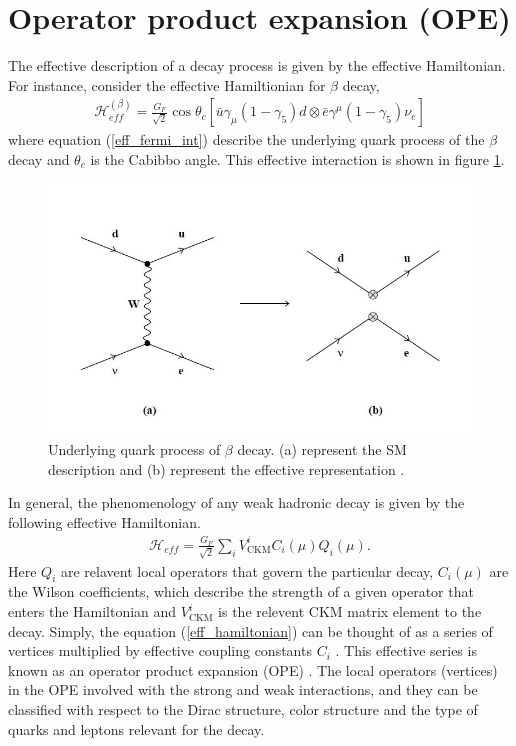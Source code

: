 \section{Operator product expansion (OPE)}
The effective description of a decay process is given by the effective Hamiltonian. For instance, consider the effective Hamiltionian for $\beta$ decay,
\begin{eqnarray}\label{eff_fermi_int}
\mathcal{H}_{e f f}^{(\beta)}=\frac{G_{F}}{\sqrt{2}} \cos \theta_{c}\left[\bar{u} \gamma_{\mu}\left(1-\gamma_{5}\right) d \otimes \bar{e} \gamma^{\mu}\left(1-\gamma_{5}\right) \nu_{e}\right]
\end{eqnarray}
where equation (\ref{eff_fermi_int}) describe the underlying quark process of the $\beta$ decay and $\theta_c$ is the Cabibbo angle. This effective interaction is shown in figure \ref{fig:fermi_int}.
\begin{figure}[H]
\centering
\includegraphics[width=12cm]{fermi_int.JPG}
\caption{\label{fig:fermi_int}
Underlying quark process of $\beta$ decay. (a) represent the SM description and (b) represent the effective representation \cite{Buras:1999rb} .}
\end{figure}
In general, the phenomenology of any weak hadronic decay is given by the following effective Hamiltonian.
\begin{eqnarray}\label{eff_hamiltonian}
\mathcal{H}_{e f f}=\frac{G_{F}}{\sqrt{2}} \sum_{i} V_{\mathrm{CKM}}^{i} C_{i}(\mu) Q_{i}(\mu).
\end{eqnarray}
Here $Q_i$ are relavent local operators that govern the particular decay, $C_{i}(\mu)$ are the Wilson coefficients, which describe the strength of a given operator that enters the Hamiltonian and $V_{\mathrm{CKM}}^{i}$ is the relevent CKM matrix element to the decay. Simply, the equation (\ref{eff_hamiltonian}) can be thought of as a series of vertices multiplied by effective coupling constants $C_i$ \cite{Buras:1999rb}. This effective series is known as an operator product expansion (OPE) \cite{Wilson:1969zs, Wilson:1972ee,Zimmermann:1972tv}. The local operators (vertices) in the OPE involved with the strong and weak interactions, and they can be classified with respect to the Dirac structure, color structure and the type of quarks and leptons relevant for the decay.

